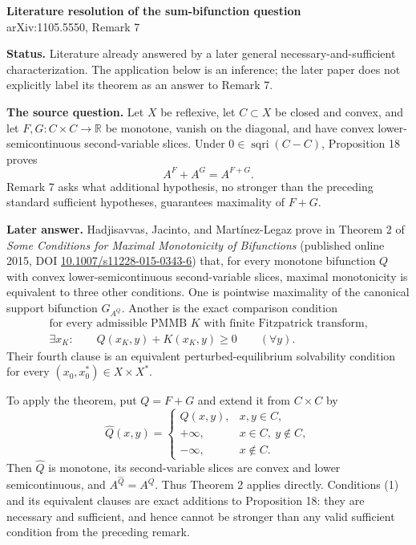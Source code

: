 \documentclass[11pt]{article}
\newcommand{\R}{\mathbb R}
\begin{document}
\begin{center}
{\Large\bfseries Literature resolution of the sum-bifunction question}\\[3pt]
{\large arXiv:1105.5550, Remark 7}
\end{center}

\textbf{Status.} Literature already answered by a later general
necessary-and-sufficient characterization.  The application below is an
inference; the later paper does not explicitly label its theorem as an answer
to Remark 7.

\textbf{The source question.}  Let $X$ be reflexive, let $C\subset X$ be
closed and convex, and let $F,G:C\times C\to\R$ be monotone, vanish on the
diagonal, and have convex lower-semicontinuous second-variable slices.  Under
$0\in\operatorname{sqri}(C-C)$, Proposition 18 proves
\[
 A^F+A^G=A^{F+G}.
\]
Remark 7 asks what additional hypothesis, no stronger than the preceding
standard sufficient hypotheses, guarantees maximality of $F+G$.

\textbf{Later answer.}  Hadjisavvas, Jacinto, and Mart\'inez-Legaz prove in
Theorem 2 of \emph{Some Conditions for Maximal Monotonicity of Bifunctions}
(published online 2015, DOI
\href{https://doi.org/10.1007/s11228-015-0343-6}{10.1007/s11228-015-0343-6})
that, for every monotone bifunction $Q$ with convex lower-semicontinuous
second-variable slices, maximal monotonicity is equivalent to three other
conditions.  One is pointwise maximality of the canonical support
bifunction $G_{A^Q}$.  Another is the exact comparison condition
\begin{equation}
\begin{gathered}
 \text{for every admissible PMMB }K\text{ with finite Fitzpatrick transform,}\\
 \exists x_K:\qquad Q(x_K,y)+K(x_K,y)\ge0\qquad(\forall y).
\end{gathered}
\tag{1}
\end{equation}
Their fourth clause is an equivalent perturbed-equilibrium solvability
condition for every $(x_0,x_0^*)\in X\times X^*$.

To apply the theorem, put $Q=F+G$ and extend it from $C\times C$ by
\[
 \widehat Q(x,y)=
 \begin{cases}
 Q(x,y),&x,y\in C,\\
 +\infty,&x\in C,\ y\notin C,\\
 -\infty,&x\notin C.
 \end{cases}
 \tag{2}
\]
Then $\widehat Q$ is monotone, its second-variable slices are convex and
lower semicontinuous, and $A^{\widehat Q}=A^Q$.  Thus Theorem 2 applies
directly.  Conditions (1) and its equivalent clauses are exact additions to
Proposition 18: they are necessary and sufficient, and hence cannot be
stronger than any valid sufficient condition from the preceding remark.
\end{document}
